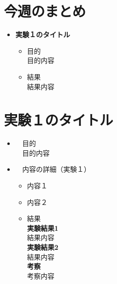 \documentclass{ltjsarticle}
\begin{document}
    \section{今週のまとめ}
    \begin{itemize}
        \item \textbf{実験１のタイトル}
        \vspace{1.5mm}
        \begin{itemize}
            \item 目的\\
            目的内容
            \vspace{1.5mm}
            \item 結果\\
            結果内容
        \end{itemize}

    \end{itemize}
        \section{実験１のタイトル}
        \begin{itemize}
            \item \large　目的\\
                \normalsize　目的内容
                \vspace{2mm}

            \item \large　内容の詳細（実験１）\\
            \begin{itemize}
                \item 内容１\\
                \item 内容２\\                    
                \item 結果\\
                    \textbf{実験結果1}\\
                    \vspace{4mm}
                    結果内容\\


                    \textbf{実験結果2}\\
                    \vspace{4mm}
                    結果内容\\

                    \textbf{考察}\\
                        \normalsize 考察内容

            \end{itemize}
        \end{itemize}
\end{document}
